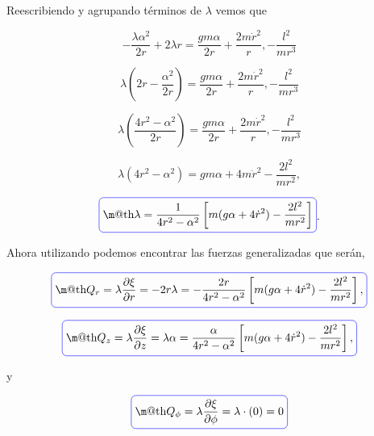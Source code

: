 \documentclass[a4paper,10pt]{article}
\makeatletter
\numberwithin{equation}{section}
\newcommand*{\boxcolor}{blue}
\renewcommand{\boxed}[1]{\textcolor{\boxcolor}{%
\tikz[baseline={([yshift=-1ex]current bounding box.center)}] \node [rectangle, minimum width=1ex,rounded corners,draw] {\normalcolor\m@th$\displaystyle#1$};}}
\makeatother
\begin{document}
Reescribiendo y agrupando términos de $\lambda$ vemos que

\begin{equation}
 - \frac{\lambda \alpha^2}{2r} + 2 \lambda r = \frac{gm\alpha}{2r} + \frac{2m\dot{r}^2}{r},
 - \frac{l^2}{mr^3}
\end{equation}

\begin{equation}
 \lambda \left(2r - \frac{\alpha^2}{2r}\right) = \frac{gm\alpha}{2r} + \frac{2m\dot{r}^2}{r},
 - \frac{l^2}{mr^3}
\end{equation}

\begin{equation}
 \lambda \left(\frac{4r^2 - \alpha^2}{2r}\right) = \frac{gm\alpha}{2r} + \frac{2m\dot{r}^2}{r},
 - \frac{l^2}{mr^3}
\end{equation}

\begin{equation}
 \lambda(4r^2 - \alpha^2) = gm\alpha + 4 m\dot{r}^2 - \frac{2l^2}{mr^2},
\end{equation}

\begin{equation}
 \boxed{\lambda = \frac{1}{4r^2 - \alpha^2} \left[ m(g\alpha + 4 \dot{r}^2) - \frac{2l^2}{mr^2}\right]}.
\end{equation}

Ahora utilizando  podemos encontrar las fuerzas generalizadas 
que serán,

\begin{equation}
 \boxed{Q_r = \lambda \frac{\partial \xi}{\partial r} = - 2r\lambda = 
 - \frac{2r}{4r^2 - \alpha^2} \left[ m(g\alpha + 4 \dot{r}^2) - \frac{2l^2}{mr^2}\right],}
\end{equation}

\begin{equation}
 \boxed{Q_z = \lambda \frac{\partial \xi}{\partial z} = \lambda \alpha = 
 \frac{\alpha}{4r^2 - \alpha^2} \left[ m(g\alpha + 4 \dot{r}^2) - \frac{2l^2}{mr^2}\right],}
\end{equation}

y 

\begin{equation}
 \boxed{Q_{\phi} = \lambda \frac{\partial \xi}{\partial \phi} = \lambda \cdot (0) = 0}
\end{equation}
\end{document}
